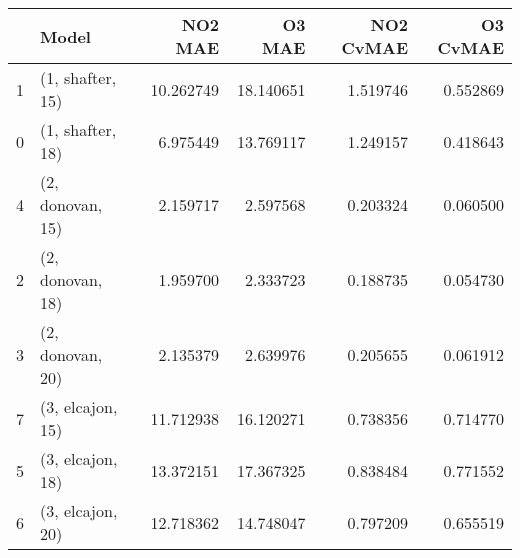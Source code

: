\begin{tabular}{llrrrr}
\toprule
{} &             Model &    NO2 MAE &     O3 MAE &  NO2 CvMAE &  O3 CvMAE \\
\midrule
1 &  (1, shafter, 15) &  10.262749 &  18.140651 &   1.519746 &  0.552869 \\
0 &  (1, shafter, 18) &   6.975449 &  13.769117 &   1.249157 &  0.418643 \\
4 &  (2, donovan, 15) &   2.159717 &   2.597568 &   0.203324 &  0.060500 \\
2 &  (2, donovan, 18) &   1.959700 &   2.333723 &   0.188735 &  0.054730 \\
3 &  (2, donovan, 20) &   2.135379 &   2.639976 &   0.205655 &  0.061912 \\
7 &  (3, elcajon, 15) &  11.712938 &  16.120271 &   0.738356 &  0.714770 \\
5 &  (3, elcajon, 18) &  13.372151 &  17.367325 &   0.838484 &  0.771552 \\
6 &  (3, elcajon, 20) &  12.718362 &  14.748047 &   0.797209 &  0.655519 \\
\bottomrule
\end{tabular}
